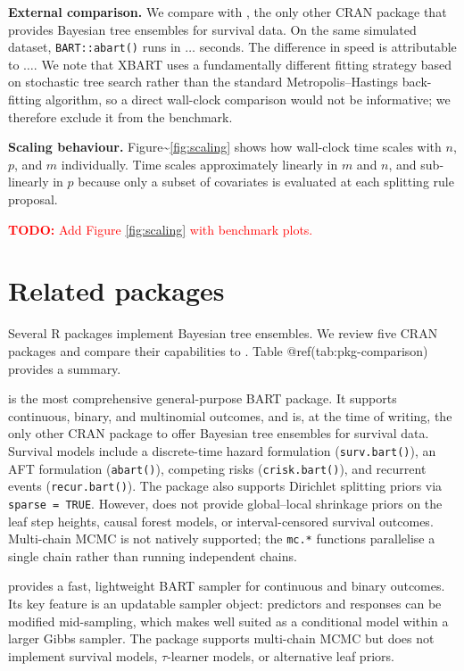 \textbf{External comparison.} We compare  with  \citep{sparapani2021nonparametric}, the only other CRAN package that provides Bayesian tree ensembles for survival data. On the same simulated dataset, \texttt{BART::abart()} runs in \(\ldots\) seconds. The difference in speed is attributable to \(\ldots\). We note that XBART \citep{he2019xbart} uses a fundamentally different fitting strategy based on stochastic tree search rather than the standard Metropolis--Hastings back-fitting algorithm, so a direct wall-clock comparison would not be informative; we therefore exclude it from the benchmark.

\textbf{Scaling behaviour.} Figure\textasciitilde{}\ref{fig:scaling} shows how wall-clock time scales with \(n\), \(p\), and \(m\) individually. Time scales approximately linearly in \(m\) and \(n\), and sub-linearly in \(p\) because only a subset of covariates is evaluated at each splitting rule proposal.

\textcolor{red}{\textbf{TODO:} Add Figure \ref{fig:scaling} with benchmark plots.}

\section{Related packages}\label{related-packages}

Several R packages implement Bayesian tree ensembles. We review five CRAN packages and compare their capabilities to . Table @ref(tab:pkg-comparison) provides a summary.

 \citep{sparapani2021nonparametric} is the most comprehensive general-purpose BART package. It supports continuous, binary, and multinomial outcomes, and is, at the time of writing, the only other CRAN package to offer Bayesian tree ensembles for survival data. Survival models include a discrete-time hazard formulation (\texttt{surv.bart()}), an AFT formulation (\texttt{abart()}), competing risks (\texttt{crisk.bart()}), and recurrent events (\texttt{recur.bart()}). The package also supports Dirichlet splitting priors via \texttt{sparse\ =\ TRUE}. However,  does not provide global--local shrinkage priors on the leaf step heights, causal forest models, or interval-censored survival outcomes. Multi-chain MCMC is not natively supported; the \texttt{mc.*} functions parallelise a single chain rather than running independent chains.

 \citep{dorie2023dbarts} provides a fast, lightweight BART sampler for continuous and binary outcomes. Its key feature is an updatable sampler object: predictors and responses can be modified mid-sampling, which makes  well suited as a conditional model within a larger Gibbs sampler. The package supports multi-chain MCMC but does not implement survival models, \(\tau\)-learner models, or alternative leaf priors.

